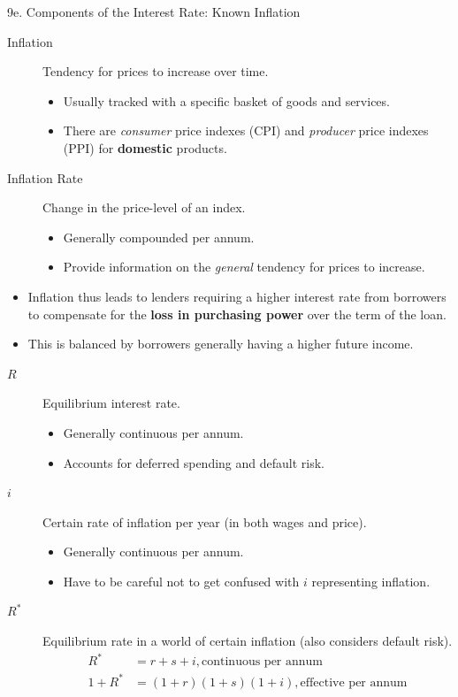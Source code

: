 \begin{CHPT_SUMM_AUTO}[label = {L.-9e}]{9e. Components of the Interest Rate: Known Inflation}
\begin{description}
	\item[Inflation]	Tendency for prices to increase over time.
		\begin{itemize}[leftmargin = *]
		\item	Usually tracked with a specific basket of goods and services.
		\item	There are \textit{consumer} price indexes (CPI) and \textit{producer} price indexes (PPI) for \textbf{domestic} products.
		\end{itemize}
	\item[Inflation Rate]	Change in the price-level of an index.
		\begin{itemize}[leftmargin = *]
		\item	Generally compounded per annum.
		\item	Provide information on the \textit{general} tendency for prices to increase.
		\end{itemize}
\end{description}
\begin{itemize}[leftmargin = *]
	\item	Inflation thus leads to lenders requiring a higher interest rate from borrowers to compensate for the \textbf{loss in purchasing power} over the term of the loan.
	\item	This is balanced by borrowers generally having a higher future income.
\end{itemize}

\begin{description}
	\item[$R$]	Equilibrium interest rate.
		\begin{itemize}[leftmargin = *]
		\item	Generally continuous per annum.
		\item	Accounts for deferred spending and default risk.
		\end{itemize}
	\item[$i$]	Certain rate of inflation per year (in both wages and price).
		\begin{itemize}[leftmargin = *]
		\item	Generally continuous per annum.
		\item	Have to be careful not to get confused with $i$ representing inflation.
		\end{itemize}
	\item[$R^{*}$]	Equilibrium rate in a world of certain inflation (also considers default risk).
		\begin{align*}
		R^{*}	&=	r + s + i, \text{continuous per annum}	\\
		1 + R^{*}	&=	(1 + r) (1 + s) (1 + i), \text{effective per annum}	\\
		\end{align*}
\end{description}
\end{CHPT_SUMM_AUTO}

